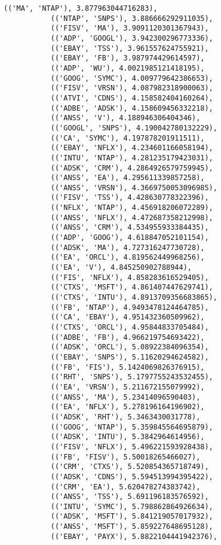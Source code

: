 \documentclass[11pt]{article}
\begin{document}
\begin{Verbatim}[commandchars=\\\{\}]
           (('MA', 'NTAP'), 3.877963044716283),
           (('NTAP', 'SNPS'), 3.886666292911035),
           (('FISV', 'MA'), 3.9091120301367943),
           (('ADP', 'GOOGL'), 3.942300296773336),
           (('EBAY', 'TSS'), 3.961557624755921),
           (('EBAY', 'FB'), 3.987974429614597),
           (('ADP', 'WU'), 4.0021985121418195),
           (('GOOG', 'SYMC'), 4.009779642386653),
           (('FISV', 'VRSN'), 4.087982318900063),
           (('ATVI', 'CDNS'), 4.158582404160264),
           (('ADBE', 'ADSK'), 4.158609456332218),
           (('ANSS', 'V'), 4.188946306404346),
           (('GOOGL', 'SNPS'), 4.190042780132229),
           (('CA', 'SYMC'), 4.197878201911511),
           (('EBAY', 'NFLX'), 4.234601166058194),
           (('INTU', 'NTAP'), 4.281235179423031),
           (('ADSK', 'CRM'), 4.2864926579759945),
           (('ANSS', 'EA'), 4.295611339857258),
           (('ANSS', 'VRSN'), 4.3669750053096985),
           (('FISV', 'TSS'), 4.428630778322396),
           (('NFLX', 'NTAP'), 4.456918206072289),
           (('ANSS', 'NFLX'), 4.472687358212998),
           (('ANSS', 'CRM'), 4.534955933384435),
           (('ADP', 'GOOG'), 4.618847052101154),
           (('ADSK', 'MA'), 4.727316247730728),
           (('EA', 'ORCL'), 4.819562449968256),
           (('EA', 'V'), 4.845250902788944),
           (('FIS', 'NFLX'), 4.858283616529405),
           (('CTXS', 'MSFT'), 4.861407447629741),
           (('CTXS', 'INTU'), 4.8913709356683865),
           (('FB', 'NTAP'), 4.9493478124464785),
           (('CA', 'EBAY'), 4.951432360509962),
           (('CTXS', 'ORCL'), 4.95844833705484),
           (('ADBE', 'FB'), 4.966219754693422),
           (('ADSK', 'ORCL'), 5.08922384096354),
           (('EBAY', 'SNPS'), 5.11620294624582),
           (('FB', 'FIS'), 5.1424069826376915),
           (('RHT', 'SNPS'), 5.1797755243532455),
           (('EA', 'VRSN'), 5.211672155079992),
           (('ANSS', 'MA'), 5.23414096590403),
           (('EA', 'NFLX'), 5.278196164196902),
           (('ADSK', 'RHT'), 5.3463430031778),
           (('GOOG', 'NTAP'), 5.359845564695879),
           (('ADSK', 'INTU'), 5.3842964614956),
           (('FISV', 'NFLX'), 5.496221593928438),
           (('FB', 'FISV'), 5.50018265466027),
           (('CRM', 'CTXS'), 5.520854365718749),
           (('ADSK', 'CDNS'), 5.594513994395422),
           (('CRM', 'EA'), 5.620478274383742),
           (('ANSS', 'TSS'), 5.691196183576592),
           (('INTU', 'SYMC'), 5.798862864926634),
           (('ADSK', 'MSFT'), 5.841219057017932),
           (('ANSS', 'MSFT'), 5.859227648695128),
           (('EBAY', 'PAYX'), 5.8822104441942376),

\end{Verbatim}
\end{document}

